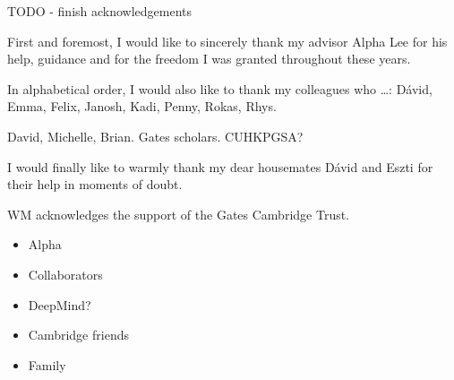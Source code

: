 
\begin{acknowledgements}

TODO - finish acknowledgements

First and foremost, I would like to sincerely thank my advisor Alpha Lee for his help, guidance and for the freedom I was granted throughout these years.

In alphabetical order, I would also like to thank my colleagues who \dots: Dávid, Emma, Felix,  Janosh, Kadi, Penny, Rokas, Rhys.

David, Michelle, Brian. Gates scholars. CUHKPGSA?

I would finally like to warmly thank my dear housemates Dávid and Eszti for their help in moments of doubt.

WM acknowledges the support of the Gates Cambridge Trust.

\begin{itemize}
    \item Alpha
    \item Collaborators
    \item DeepMind?
    \item Cambridge friends
    \item Family
\end{itemize}

\end{acknowledgements}
